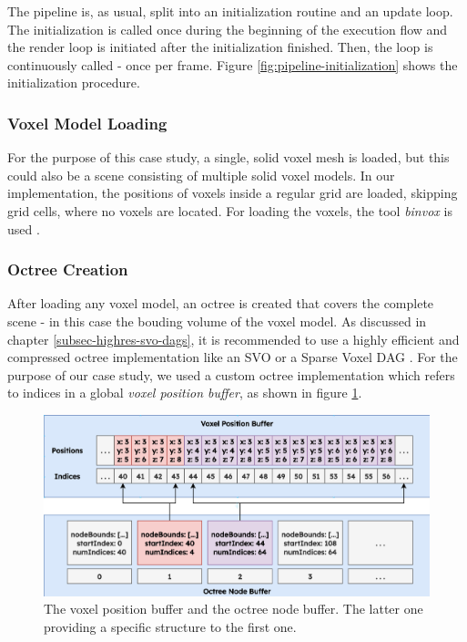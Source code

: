 \noindent
The pipeline is, as usual, split into an initialization routine and an update loop. The initialization is 
called once during the beginning of the execution flow and the render loop is initiated after the initialization 
finished. Then, the loop is continuously called - once per frame. Figure \ref{fig:pipeline-initialization} shows 
the initialization procedure. 

\subsubsection*{Voxel Model Loading} \label{subsec-voxel-model-loading}

For the purpose of this case study, a single, solid voxel mesh is loaded, but this could also be a scene 
consisting of multiple solid voxel models. In our implementation, the positions of voxels inside a regular 
grid are loaded, skipping grid cells, where no voxels are located. For loading the voxels, the tool \emph{binvox} 
is used \cite{binvox, Nooruddin2003}. 


\subsubsection*{Octree Creation} \label{subsec-octree-creation}

After loading any voxel model, an octree is created that covers the complete scene - in this case the bouding 
volume of the voxel model. As discussed in chapter \ref{subsec-highres-svo-dags}, it is recommended to use a 
highly efficient and compressed octree implementation like an \ac{SVO} or a Sparse Voxel \ac{DAG} \cite{Kampe2013}. 
For the purpose of our case study, we used a custom octree implementation which refers to indices in a global 
\emph{voxel position buffer}, as shown in figure \ref{fig:voxelpos-octreenode-buffer}.\\

\begin{figure}[h]
    \centering
    \includegraphics[width=\linewidth]{images/graphics/voxelpos-octreenode-buffer.jpg}
    \caption{The voxel position buffer and the octree node buffer. The latter one providing a 
    specific structure to the first one.}
    \label{fig:voxelpos-octreenode-buffer}
\end{figure}

